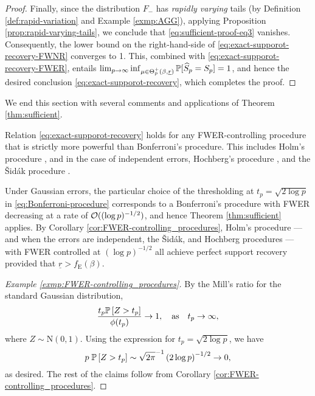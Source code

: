 \begin{proof}
Finally, since the distribution $F_-$ has \emph{rapidly varying} tails (by Definition \ref{def:rapid-variation} and Example \ref{exmp:AGG}), applying Proposition \ref{prop:rapid-varying-tails}, we conclude that \eqref{eq:sufficient-proof-eq3} vanishes. Consequently, the lower bound on the right-hand-side of \eqref{eq:exact-supporot-recovery-FWNR} converges to 1.
This, combined with \eqref{eq:exact-supporot-recovery-FWER}, entails {$\lim_{p\to\infty} \inf_{\mu\in\Theta_p^+(\beta, \underline{r})} \P[\widehat{S}_p = S_p]= 1$, and hence the desired conclusion \eqref{eq:exact-supporot-recovery}, which completes the proof}.
\end{proof}

\medskip
We end this section with several comments and applications of Theorem \ref{thm:sufficient}.
\begin{corollary}
\label{cor:FWER-controlling_procedures}  
Relation \eqref{eq:exact-supporot-recovery} holds for any FWER-controlling procedure that is strictly more powerful than Bonferroni's procedure. 
This includes Holm's procedure \citep*{holm1979simple}, and in the case of independent errors, Hochberg's procedure \citep*{hochberg1988sharper}, and the {\v{S}}id{\'a}k procedure \citep*{vsidak1967rectangular}.
\end{corollary}

\begin{example} \label{exmp:FWER-controlling_procedures}
Under Gaussian errors, the particular choice of the thresholding at $t_p = \sqrt{2\log{p}}$ in \eqref{eq:Bonferroni-procedure} corresponds to a Bonferroni's procedure with FWER decreasing at a rate of ${\cal O}((\log{p})^{-1/2})$, and hence Theorem \ref{thm:sufficient} applies. 
By Corollary \ref{cor:FWER-controlling_procedures}, Holm's procedure --- and when the errors are independent, the {\v{S}}id{\'a}k, and Hochberg procedures --- with FWER controlled at $(\log{p})^{-1/2}$ all achieve perfect support recovery provided that $\underline{r}>f_{\mathrm{E}}(\beta)$.

\begin{proof}[Example \ref{exmp:FWER-controlling_procedures}]
By the Mill's ratio for the standard Gaussian distribution,
$$
\frac{t_p \P\left[Z>t_p\right]}{\phi(t_p)} \to 1,\quad \text{as}\quad t_p\to\infty,
$$
where $Z\sim \text{N}(0,1)$. 
Using the expression for $t_p = \sqrt{2\log{p}}$, we have
$$
p \;\P\left[Z>t_p\right] \sim \sqrt{2\pi}^{-1}\left(2\log{p}\right)^{-1/2} \to 0,
$$
as desired. The rest of the claims follow from Corollary \ref{cor:FWER-controlling_procedures}.
\end{proof}
\end{example}


